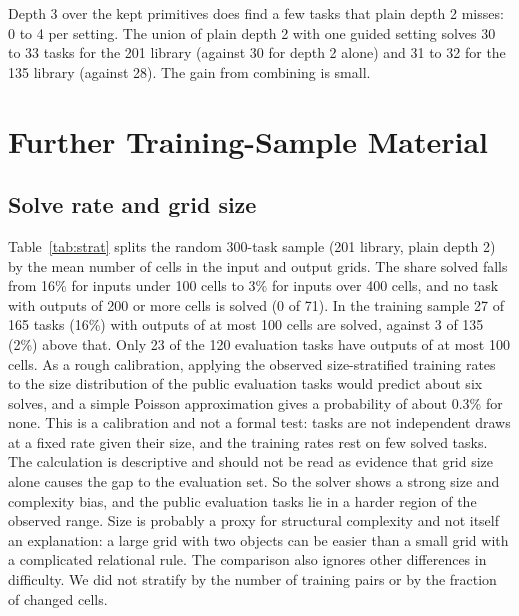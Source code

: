 \documentclass[sigconf,nonacm]{acmart}
\begin{document}
Depth 3 over the kept primitives does find a few tasks that plain depth 2 misses: 0 to 4 per setting. The union of plain depth 2 with one guided setting solves 30 to 33 tasks for the 201 library (against 30 for depth 2 alone) and 31 to 32 for the 135 library (against 28). The gain from combining is small.




\section{Further Training-Sample Material}

\subsection{Solve rate and grid size}\label{sec:size}

Table~\ref{tab:strat} splits the random 300-task sample (201 library, plain depth 2) by the mean number of cells in the input and output grids. The share solved falls from 16\% for inputs under 100 cells to 3\% for inputs over 400 cells, and no task with outputs of 200 or more cells is solved (0 of 71). In the training sample 27 of 165 tasks (16\%) with outputs of at most 100 cells are solved, against 3 of 135 (2\%) above that. Only 23 of the 120 evaluation tasks have outputs of at most 100 cells. As a rough calibration, applying the observed size-stratified training rates to the size distribution of the public evaluation tasks would predict about six solves, and a simple Poisson approximation gives a probability of about 0.3\% for none. This is a calibration and not a formal test: tasks are not independent draws at a fixed rate given their size, and the training rates rest on few solved tasks. The calculation is descriptive and should not be read as evidence that grid size alone causes the gap to the evaluation set. So the solver shows a strong size and complexity bias, and the public evaluation tasks lie in a harder region of the observed range. Size is probably a proxy for structural complexity and not itself an explanation: a large grid with two objects can be easier than a small grid with a complicated relational rule. The comparison also ignores other differences in difficulty. We did not stratify by the number of training pairs or by the fraction of changed cells.

\begin{table}[t]
\caption{Tasks fully solved in the random 300-task sample (201 library, plain depth 2), by mean grid size in cells.}
\label{tab:strat}
\footnotesize\setlength{\tabcolsep}{4pt}

\end{table}
\end{document}
